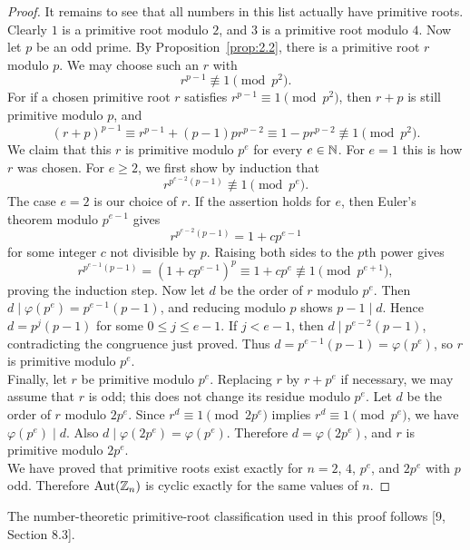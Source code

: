 \documentclass[../Odyssey_Project.tex]{subfiles}
\begin{document}
\begin{proof}
    It remains to see that all numbers in this list actually have primitive roots. Clearly $1$ is a primitive root modulo $2$, and $3$ is a primitive root modulo $4$. Now let $p$ be an odd prime. By Proposition~\ref{prop:2.2}, there is a primitive root $r$ modulo $p$. We may choose such an $r$ with
    \[
        r^{p-1} \not\equiv 1 \pmod{p^2}.
    \]
    For if a chosen primitive root $r$ satisfies $r^{p-1} \equiv 1 \pmod{p^2}$, then $r + p$ is still primitive modulo $p$, and
    \[
        (r+p)^{p-1} \equiv r^{p-1} + (p-1)pr^{p-2}
        \equiv 1 - pr^{p-2} \not\equiv 1 \pmod{p^2}.
    \]
    We claim that this $r$ is primitive modulo $p^e$ for every $e \in \mathbb{N}$. For $e = 1$ this is how $r$ was chosen. For $e \geq 2$, we first show by induction that
    \[
        r^{p^{e-2}(p-1)} \not\equiv 1 \pmod{p^e}.
    \]
    The case $e = 2$ is our choice of $r$. If the assertion holds for $e$, then Euler's theorem modulo $p^{e-1}$ gives
    \[
        r^{p^{e-2}(p-1)} = 1 + cp^{e-1}
    \]
    for some integer $c$ not divisible by $p$. Raising both sides to the $p$th power gives
    \[
        r^{p^{e-1}(p-1)} = (1 + cp^{e-1})^p \equiv 1 + cp^e \not\equiv 1 \pmod{p^{e+1}},
    \]
    proving the induction step. Now let $d$ be the order of $r$ modulo $p^e$. Then $d \mid \varphi(p^e) = p^{e-1}(p-1)$, and reducing modulo $p$ shows $p-1 \mid d$. Hence $d = p^j(p-1)$ for some $0 \leq j \leq e-1$. If $j < e-1$, then $d \mid p^{e-2}(p-1)$, contradicting the congruence just proved. Thus $d = p^{e-1}(p-1) = \varphi(p^e)$, so $r$ is primitive modulo $p^e$. \\
    Finally, let $r$ be primitive modulo $p^e$. Replacing $r$ by $r+p^e$ if necessary, we may assume that $r$ is odd; this does not change its residue modulo $p^e$. Let $d$ be the order of $r$ modulo $2p^e$. Since $r^d \equiv 1 \pmod{2p^e}$ implies $r^d \equiv 1 \pmod{p^e}$, we have $\varphi(p^e) \mid d$. Also $d \mid \varphi(2p^e) = \varphi(p^e)$. Therefore $d = \varphi(2p^e)$, and $r$ is primitive modulo $2p^e$. \\
    We have proved that primitive roots exist exactly for $n = 2$, $4$, $p^e$, and $2p^e$ with $p$ odd. Therefore $\operatorname{Aut}(\mathbb{Z}_n)$ is cyclic exactly for the same values of $n$.
\end{proof}

\noindent The number-theoretic primitive-root classification used in this proof follows [9, Section 8.3].
\end{document}

